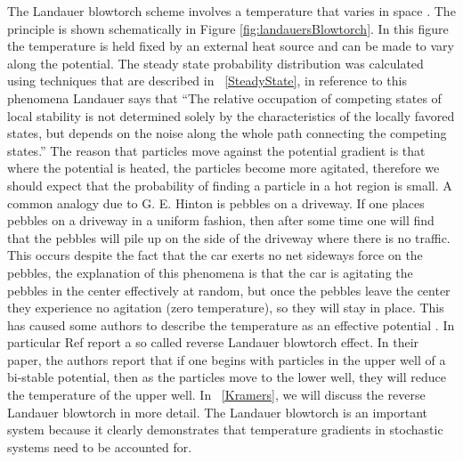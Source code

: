 The Landauer blowtorch scheme involves a temperature that varies in space \cite{Landauer1988}. The principle is shown schematically in Figure \ref{fig:landauersBlowtorch}. In this figure the temperature is held fixed by an external heat source and can be made to vary along the potential. The steady state probability distribution was calculated using techniques that are described in ~\autoref{SteadyState}, in reference to this phenomena Landauer says that \cite{Landauer1988}  ``The relative occupation of competing states of local stability is not determined solely by the characteristics of the locally favored states, but depends on the noise along the whole path connecting the competing states.'' The reason that particles move against the potential gradient is that where the potential is heated, the particles become more agitated, therefore we should expect that the probability of finding a particle in a hot region is small. A common analogy due to G. E. Hinton is pebbles on a driveway. If one places pebbles on a driveway in a uniform fashion, then after some time one will find that the pebbles will pile up on the side of the driveway where there is no traffic. This occurs despite the fact that the car exerts no net sideways force on the pebbles, the explanation of this phenomena is that the car is agitating the pebbles in the center effectively at random, but once the pebbles leave the center they experience no agitation (zero temperature), so they will stay in place. This has caused some authors to describe the temperature as an effective potential \cite{Gardiner2009, Kampen1988}. In particular Ref \cite{DasDasBarikEtAl2015} report a so called reverse Landauer blowtorch effect. In their paper, the authors report that if one begins with particles in the upper well of a bi-stable potential, then as the particles move to the lower well, they will reduce the temperature of the upper well. In ~\autoref{Kramers}, we will discuss the reverse Landauer blowtorch in more detail. The Landauer blowtorch is an important system because it clearly demonstrates that temperature gradients in stochastic systems need to be accounted for.

